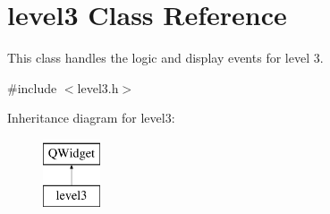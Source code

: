 \hypertarget{classlevel3}{}\section{level3 Class Reference}
\label{classlevel3}


This class handles the logic and display events for level 3.  




{\ttfamily \#include $<$level3.\+h$>$}

Inheritance diagram for level3\+:\begin{figure}[H]
\begin{center}
\leavevmode
\includegraphics[height=2.000000cm]{classlevel3}
\end{center}
\end{figure}
